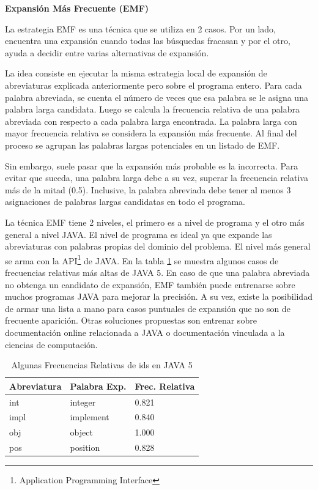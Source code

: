 \documentclass[a4paper,12pt]{report}
\begin{document}
\noindent \textbf{Expansión Más Frecuente (EMF)\\}


La estrategia EMF \cite{EZH08} es una técnica que se utiliza en 2 casos. Por un lado, 
encuentra una expansión cuando todas las búsquedas fracasan y por el otro, ayuda a decidir entre varias alternativas de expansión. 

La idea consiste en ejecutar la misma estrategia local de expansión de abreviaturas explicada anteriormente pero sobre el programa entero. Para cada palabra abreviada, se cuenta el número de veces que esa palabra se le asigna una palabra larga candidata. Luego se calcula la frecuencia relativa de una palabra abreviada con respecto a cada palabra larga encontrada. La palabra larga con mayor frecuencia relativa se considera la expansión más frecuente. Al final del proceso se agrupan las palabras largas potenciales en un listado de EMF.

Sin embargo, suele pasar que la expansión más probable es la incorrecta. Para evitar que suceda, una palabra larga debe a su vez, superar la frecuencia relativa más de la mitad (0.5). Inclusive, la palabra abreviada debe tener al menos 3 asignaciones de palabras largas candidatas en todo el programa.

La técnica EMF tiene 2 niveles, el primero es a nivel de programa y el otro más general a nivel JAVA. El nivel de programa es ideal ya que expande las abreviaturas con palabras propias del dominio del problema. El nivel más general se arma con la API\footnote[1]{Application Programming Interface} de JAVA. En la tabla \ref{tab_emf} se muestra algunos casos de frecuencias relativas más altas de JAVA 5. En caso de que una palabra abreviada no obtenga un candidato de expansión, EMF también puede entrenarse sobre muchos programas JAVA para mejorar la precisión. A su vez, existe la posibilidad de armar una lista a mano para casos puntuales de expansión que no son de frecuente aparición. Otras soluciones propuestas son entrenar sobre documentación online relacionada a JAVA o documentación vinculada a la ciencias de computación.

\begin{table}
\begin{center}
   \begin{tabular}{| l |l | l |}
     \hline \textsf{Abreviatura} & \textsf{Palabra Exp.} & \textsf{Frec. Relativa} \\
     \hline \textsf{int} & \textsf{integer} & 0.821 \\
     \hline \textsf{impl} & \textsf{implement} & 0.840 \\
     \hline \textsf{obj} & \textsf{object} & 1.000 \\
     \hline \textsf{pos} & \textsf{position} & 0.828 \\
     \hline	   
   \end{tabular}
   \label{tab_emf}
\caption{Algunas Frecuencias Relativas de ids en JAVA 5}
\end{center}   
\end {table}
\end{document}
